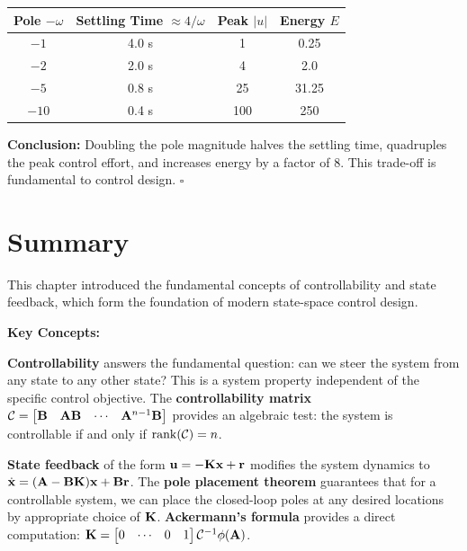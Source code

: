 \begin{example}
\begin{center}
\begin{tabular}{cccc}
\toprule
Pole $-\omega$ & Settling Time $\approx 4/\omega$ & Peak $|u|$ & Energy $E$ \\
\midrule
$-1$ & 4.0 s & 1 & 0.25 \\
$-2$ & 2.0 s & 4 & 2.0 \\
$-5$ & 0.8 s & 25 & 31.25 \\
$-10$ & 0.4 s & 100 & 250 \\
\bottomrule
\end{tabular}
\end{center}

\textbf{Conclusion:} Doubling the pole magnitude halves the settling time, quadruples the peak control effort, and increases energy by a factor of 8. This trade-off is fundamental to control design. \hfill $\square$
\end{example}

\section{Summary}

This chapter introduced the fundamental concepts of controllability and state feedback, which form the foundation of modern state-space control design.

\textbf{Key Concepts:}

\textbf{Controllability} answers the fundamental question: can we steer the system from any state to any other state? This is a system property independent of the specific control objective. The \textbf{controllability matrix} $\mathcal{C} = \begin{bmatrix} \mathbf{B} & \mathbf{A}\mathbf{B} & \cdots & \mathbf{A}^{n-1}\mathbf{B} \end{bmatrix}$ provides an algebraic test: the system is controllable if and only if $\operatorname{rank}(\mathcal{C}) = n$.

\textbf{State feedback} of the form $\mathbf{u} = -\mathbf{K}\mathbf{x} + \mathbf{r}$ modifies the system dynamics to $\dot{\mathbf{x}} = (\mathbf{A} - \mathbf{B}\mathbf{K})\mathbf{x} + \mathbf{B}\mathbf{r}$. The \textbf{pole placement theorem} guarantees that for a controllable system, we can place the closed-loop poles at any desired locations by appropriate choice of $\mathbf{K}$. \textbf{Ackermann's formula} provides a direct computation: $\mathbf{K} = \begin{bmatrix} 0 & \cdots & 0 & 1 \end{bmatrix}\mathcal{C}^{-1}\phi(\mathbf{A})$.


